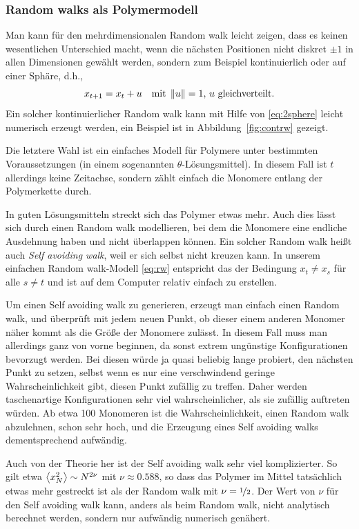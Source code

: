\subsubsection{Random walks als Polymermodell}

Man kann für den mehrdimensionalen Random walk leicht zeigen, dass es
keinen wesentlichen Unterschied macht, wenn die nächsten Positionen
nicht diskret $\pm 1$ in allen Dimensionen gewählt werden, sondern zum
Beispiel kontinuierlich oder auf einer Sphäre, d.h.,
\begin{equation}
  x_{t+1} = x_t + u \quad\text{mit}\; \left\lVert{u}\right\rVert=1,\,u\text{ gleichverteilt}.
\end{equation}
Ein solcher kontinuierlicher Random walk kann mit Hilfe von
\eqref{eq:2sphere} leicht numerisch erzeugt werden, ein Beispiel ist
in Abbildung~\ref{fig:contrw} gezeigt.

Die letztere Wahl ist ein einfaches Modell für Polymere unter
bestimmten Voraussetzungen (in einem sogenannten
$\theta$-Lösungsmittel).  In diesem Fall ist $t$ allerdings keine
Zeitachse, sondern zählt einfach die Monomere entlang der Polymerkette
durch.

In guten Lösungsmitteln streckt sich das Polymer etwas mehr. Auch dies
lässt sich durch einen Random walk modellieren, bei dem die Monomere
eine endliche Ausdehnung haben und nicht überlappen können. Ein
solcher Random walk heißt auch \emph{Self avoiding walk}, weil er sich
selbst nicht kreuzen kann. In unserem einfachen Random walk-Modell
\eqref{eq:rw} entspricht das der Bedingung $x_t\neq x_s$ für alle
$s\neq t$ und ist auf dem Computer relativ einfach zu erstellen.

Um einen Self avoiding walk zu generieren, erzeugt man einfach einen
Random walk, und überprüft mit jedem neuen Punkt, ob dieser einem
anderen Monomer näher kommt als die Größe der Monomere zulässt. In
diesem Fall muss man allerdings ganz von vorne beginnen, da sonst
extrem ungünstige Konfigurationen bevorzugt werden. Bei diesen würde
ja quasi beliebig lange probiert, den nächsten Punkt zu setzen, selbst
wenn es nur eine verschwindend geringe Wahrscheinlichkeit gibt, diesen
Punkt zufällig zu treffen. Daher werden taschenartige Konfigurationen
sehr viel wahrscheinlicher, als sie zufällig auftreten würden. Ab etwa
100 Monomeren ist die Wahrscheinlichkeit, einen Random walk
abzulehnen, schon sehr hoch, und die Erzeugung eines Self avoiding
walks dementsprechend aufwändig.

Auch von der Theorie her ist der Self avoiding walk sehr viel
komplizierter. So gilt etwa $\left\langle{x_N^2}\right\rangle \sim N^{2\nu}$ mit
$\nu\approx 0.588$, so dass das Polymer im Mittel tatsächlich etwas
mehr gestreckt ist als der Random walk mit $\nu=\nicefrac{1}{2}$. Der
Wert von $\nu$ für den Self avoiding walk kann, anders als beim Random
walk, nicht analytisch berechnet werden, sondern nur aufwändig
numerisch genähert.

